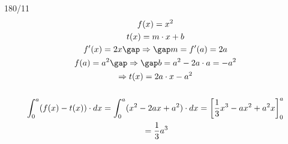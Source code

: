 \begin{exercise}{180/11}
  \begin{gather*}
    f(x) = x^2 \\
    t(x) = m \cdot x + b \\
    f'(x) = 2x \gap\Rightarrow\gap m = f'(a) = 2a \\
    f(a) = a^2 \gap\Rightarrow\gap b = a^2 - 2a \cdot a = -a^2 \\
    \Rightarrow t(x) = 2a \cdot x - a^2 \\\\
    \int_0^a (f(x) - t(x)) \cdot dx = \int_0^a (x^2 - 2ax + a^2) \cdot dx = \left[\frac{1}{3}x^3 - ax^2 + a^2x\right]_0^a \\
    \;= \frac{1}{3}a^3
  \end{gather*}
\end{exercise}
